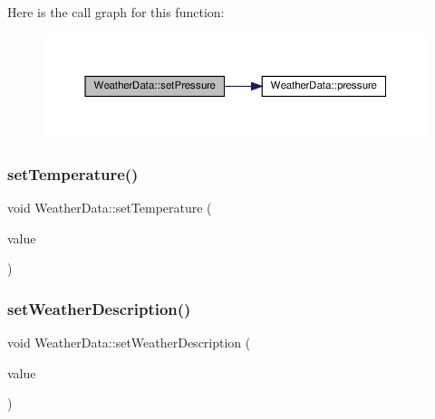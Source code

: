 Here is the call graph for this function\+:
\nopagebreak
\begin{figure}[H]
\begin{center}
\leavevmode
\includegraphics[width=350pt]{class_weather_data_ad5b453016656864e2bc3a09fc75919a0_cgraph}
\end{center}
\end{figure}
\mbox{\label{class_weather_data_afee514cbb8713059cf8d0602b33cadf5}} 
\subsubsection{\texorpdfstring{set\+Temperature()}{setTemperature()}}
{\footnotesize\ttfamily void Weather\+Data\+::set\+Temperature (\begin{DoxyParamCaption}\item[{const Q\+String \&}]{value }\end{DoxyParamCaption})}

\mbox{\label{class_weather_data_a68686722f2e0bbf5cb28f0fdc96e280d}} 
\subsubsection{\texorpdfstring{set\+Weather\+Description()}{setWeatherDescription()}}
{\footnotesize\ttfamily void Weather\+Data\+::set\+Weather\+Description (\begin{DoxyParamCaption}\item[{const Q\+String \&}]{value }\end{DoxyParamCaption})}

\mbox{\label{class_weather_data_a2a8093aaf20e1fb3c63c429a4ae0a977}} 
